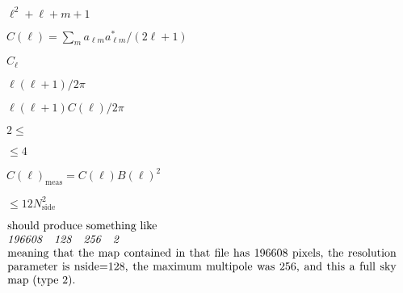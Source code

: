 \documentclass[12pt,twoside]{article}
\providecommand{\facname}{}%
\providecommand{\FACNAME}{}%
\def\lthtmlcheckvsize{\ifdim\ht\sizebox<\vsize 
  \ifdim\wd\sizebox<\hsize\expandafter\hfill\fi \expandafter\vfill
  \else\expandafter\vss\fi}%
\begin{document}
{\newpage\clearpage
{}%
$\ell^2 + \ell + m + 1$%
\lthtmlindisplaymathZ
\lthtmlcheckvsize\clearpage}

{\newpage\clearpage
{}%
$C(\ell) = \sum_m a_{\ell m}a^*_{\ell m} / (2\ell+1)$%
\lthtmlindisplaymathZ
\lthtmlcheckvsize\clearpage}

{\newpage\clearpage
{}%
$C_\ell$%
\lthtmlindisplaymathZ
\lthtmlcheckvsize\clearpage}

{\newpage\clearpage
{}%
$\ell(\ell+1)/2\pi$%
\lthtmlindisplaymathZ
\lthtmlcheckvsize\clearpage}

{\newpage\clearpage
{}%
$\ell(\ell+1)C(\ell)/2\pi$%
\lthtmlindisplaymathZ
\lthtmlcheckvsize\clearpage}


\renewcommand{\facname}{{gaussbeam}}

\renewcommand{\FACNAME}{{GAUSSBEAM}}

\renewcommand{\l}{{$\ell$\  }}
{\newpage\clearpage
{}%
$2 \le$%
\lthtmlindisplaymathZ
\lthtmlcheckvsize\clearpage}

{\newpage\clearpage
{}%
$\le 4$%
\lthtmlindisplaymathZ
\lthtmlcheckvsize\clearpage}

{\newpage\clearpage
{}%
$C(\ell)_{\mathrm{meas}} = C(\ell)
B(\ell)^2$%
\lthtmlindisplaymathZ
\lthtmlcheckvsize\clearpage}


\renewcommand{\facname}{{getdisc\_ring }}

\renewcommand{\FACNAME}{{GETDISC\_RING }}

\renewcommand{\facname}{{getsize\_fits }}

\renewcommand{\FACNAME}{{GETSIZE\_FITS }}
{\newpage\clearpage
{}%
$\le 12N_{\mathrm{side}}^2$%
\lthtmlindisplaymathZ
\lthtmlcheckvsize\clearpage}

{\newpage\clearpage
{}%
$\textstyle \parbox{\hsize}{ should produce something like \\
   {\em 196608 \ \        128 \ \         256  \ \      2} \\
meaning that the map contained in that file has 196608 pixels, the resolution parameter is
nside=128, the maximum multipole was 256, and this a full sky map
(type 2).
}$%
\lthtmlindisplaymathZ
\lthtmlcheckvsize\clearpage}
\end{document}
